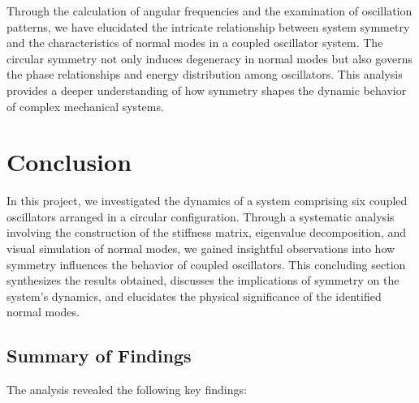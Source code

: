 \documentclass[12pt]{report} %
\begin{document}
Through the calculation of angular frequencies and the examination of oscillation patterns, we have elucidated the intricate relationship between system symmetry and the characteristics of normal modes in a coupled oscillator system. The circular symmetry not only induces degeneracy in normal modes but also governs the phase relationships and energy distribution among oscillators. This analysis provides a deeper understanding of how symmetry shapes the dynamic behavior of complex mechanical systems.

\newpage



\section{Conclusion}
\label{sec:part5_conclusion}

In this project, we investigated the dynamics of a system comprising six coupled oscillators arranged in a circular configuration. Through a systematic analysis involving the construction of the stiffness matrix, eigenvalue decomposition, and visual simulation of normal modes, we gained insightful observations into how symmetry influences the behavior of coupled oscillators. This concluding section synthesizes the results obtained, discusses the implications of symmetry on the system's dynamics, and elucidates the physical significance of the identified normal modes.

\subsection{Summary of Findings}
\label{subsec:part5_summary}

The analysis revealed the following key findings:
\end{document}
